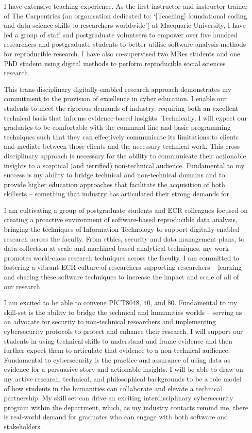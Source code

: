 \documentclass[11pt, a4paper]{awesome-cv}
\begin{document}
\begin{cvletter}
I have extensive teaching experience. As the first instructor and instructor trainer of The Carpentries (an organisation dedicated to: `[Teaching] foundational coding and data science skills to researchers worldwide') at Macquarie University, I have led a group of staff and postgraduate volunteers to empower over five hundred researchers and postgraduate students to better utilise software analysis methods for reproducible research. I have also co-supervised two MRes students and one PhD student using digital methods to perform reproducible social sciences research. 

This trans-disciplinary digitally-enabled research approach demonstrates my commitment to the provision of excellence in cyber education. I enable our students to meet the rigorous demands of industry, requiring both an excellent technical basis that informs evidence-based insights. Technically, I will expect our graduates to be comfortable with the command line and basic programming techniques such that they can effectively communicate its limitations to clients and mediate between those clients and the necessary technical work. This cross-disciplinary approach is necessary for the ability to communicate their actionable insights to a sceptical (and terrified) non-technical audience. Fundamental to my success is my ability to bridge technical and non-technical domains and to provide higher education approaches that facilitate the acquisition of both skillsets -- something that industry has articulated their strong demands for. 

I am cultivating a group of postgraduate students and ECR colleagues focused on creating a proactive environment of software-based reproducible data analysis, bringing the techniques of Information Technology to support digitally-enabled research across the faculty. From ethics, security and data management plans, to data collection at scale and machined based analytical techniques, my work promotes world-class research techniques across the faculty. I am committed to fostering a vibrant ECR culture of researchers supporting researchers -- learning and sharing these software techniques to increase the impact and scale of all of our research.

I am excited to be able to convene PICT8048, 40, and 80. Fundamental to my skill-set is the ability to bridge the technical and humanities worlds -- serving as an advocate for security to non-technical researchers and implementing cybersecurity protocols to protect and enhance their research. I will support our students in using technical skills to understand and frame evidence and then further expect them to articulate that evidence to a non-technical audience. Fundamental to cybersecurity is the practice and assurance of using data as evidence for a persuasive story and actionable insights. I will be able to draw on my active research, technical, and philosophical backgrounds to be a role model of how students in the humanities can collaborate and elevate a technical partnership. My skill set can drive an exciting interdisciplinary cybersecurity program within the department, which, as my industry contacts remind me, there is real-world demand for graduates who can engage with both software and stakeholders.


\end{cvletter}
\end{document}
